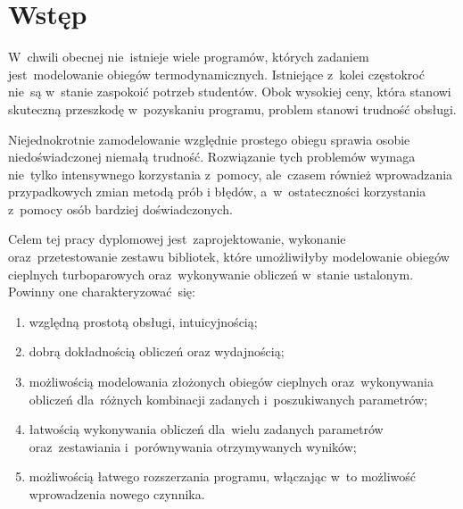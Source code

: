 \section{Wstęp}

W~chwili obecnej nie~istnieje wiele programów, których zadaniem
jest~modelowanie obiegów termodynamicznych. Istniejące z~kolei
częstokroć nie~są w~stanie zaspokoić potrzeb studentów. Obok wysokiej
ceny, która stanowi skuteczną przeszkodę w~pozyskaniu programu,
problem stanowi trudność obsługi.

Niejednokrotnie zamodelowanie względnie prostego obiegu sprawia osobie
niedoświadczonej niemałą trudność. Rozwiązanie tych problemów wymaga
nie~tylko intensywnego korzystania z~pomocy, ale~czasem również
wprowadzania przypadkowych zmian metodą prób i błędów, a~w~ostateczności
korzystania z~pomocy osób bardziej doświadczonych.

Celem tej pracy dyplomowej jest~zaprojektowanie, wykonanie
oraz~przetestowanie zestawu bibliotek, które umożliwiłyby modelowanie
obiegów cieplnych turboparowych oraz~wykonywanie obliczeń w~stanie
ustalonym. Powinny one charakteryzować~się:

\begin{enumerate}

\item względną prostotą obsługi, intuicyjnością;

\item dobrą dokładnością obliczeń oraz wydajnością;

\item możliwością modelowania złożonych obiegów cieplnych
oraz~wykonywania obliczeń dla~różnych kombinacji zadanych
i~poszukiwanych parametrów;

\item łatwością wykonywania obliczeń dla~wielu zadanych parametrów
oraz~zestawiania i~porównywania otrzymywanych wyników;

\item możliwością łatwego rozszerzania programu, włączając w~to
możliwość wprowadzenia nowego czynnika.

\end{enumerate}
